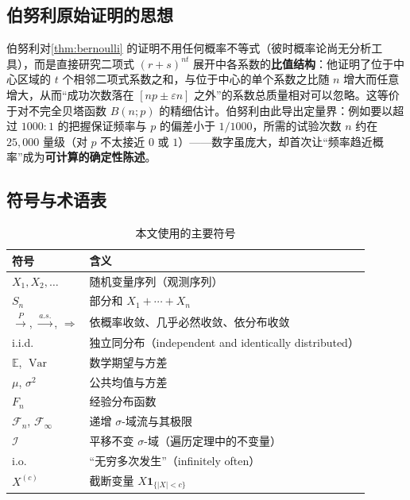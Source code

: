 \subsection{伯努利原始证明的思想}

伯努利对\cref{thm:bernoulli} 的证明不用任何概率不等式（彼时概率论尚无分析工具），而是直接研究二项式 $(r+s)^{nt}$ 展开中各系数的\textbf{比值结构}：他证明了位于中心区域的 $t$ 个相邻二项式系数之和，与位于中心的单个系数之比随 $n$ 增大而任意增大，从而“成功次数落在 $[np \pm \varepsilon n]$ 之外”的系数总质量相对可以忽略。这等价于对不完全贝塔函数 $B(n;p)$ 的精细估计。伯努利由此导出定量界：例如要以超过 $1000:1$ 的把握保证频率与 $p$ 的偏差小于 $1/1000$，所需的试验次数 $n$ 约在 $25{,}000$ 量级（对 $p$ 不太接近 $0$ 或 $1$）——数字虽庞大，却首次让“频率趋近概率”成为\textbf{可计算的确定性陈述}。

\subsection{符号与术语表}

\begin{table}[htbp]
    \centering
    \caption{本文使用的主要符号}
    \label{tab:notation}
    \begin{tabular}{ll}
        \toprule
        符号 & 含义 \\
        \midrule
        $X_1, X_2, \dots$ & 随机变量序列（观测序列） \\
        $S_n$ & 部分和 $X_1 + \cdots + X_n$ \\
        $\xrightarrow{P}$, $\xrightarrow{a.s.}$, $\Rightarrow$ & 依概率收敛、几乎必然收敛、依分布收敛 \\
        i.i.d. & 独立同分布（independent and identically distributed） \\
        $\mathbb{E}$, $\operatorname{Var}$ & 数学期望与方差 \\
        $\mu$, $\sigma^2$ & 公共均值与方差 \\
        $F_n$ & 经验分布函数 \\
        $\mathcal{F}_n$, $\mathcal{F}_\infty$ & 递增 $\sigma$-域流与其极限 \\
        $\mathcal{I}$ & 平移不变 $\sigma$-域（遍历定理中的不变量） \\
        i.o. & “无穷多次发生”（infinitely often） \\
        $X^{(c)}$ & 截断变量 $X \mathbf{1}_{\{|X| < c\}}$ \\
        \bottomrule
    \end{tabular}
\end{table}

